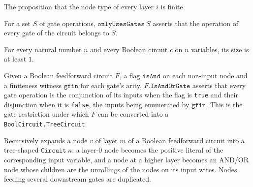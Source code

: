 \begin{definition}
\label{BoolCircuit.LayeredCircuit.Finite}
\leanok
The proposition that the node type of every layer $i$ is finite.
\end{definition}

\begin{definition}
\label{BoolCircuit.LayeredCircuit.onlyUsesGates}
\leanok
{}
For a set $S$ of gate operations, $\texttt{onlyUsesGates}\ S$ asserts that the
operation of every gate of the circuit belongs to $S$.
\end{definition}

\begin{theorem}
\label{BoolCircuit.TreeCircuit.one_le_size}
\leanok
{}
For every natural number $n$ and every Boolean circuit $c$ on $n$ variables, its size is
at least $1$.
\end{theorem}

\begin{definition}
\label{BoolCircuit.LayeredCircuit.IsAndOrGate}
\leanok
{}
Given a Boolean feedforward circuit $F$, a flag $\texttt{isAnd}$ on each non-input
node and a finiteness witness $\texttt{gfin}$ for each gate's arity,
$F.\texttt{IsAndOrGate}$ asserts that every gate operation is the conjunction of its
inputs when the flag is \texttt{true} and their disjunction when it is \texttt{false},
the inputs being enumerated by $\texttt{gfin}$. This is the gate restriction under
which $F$ can be converted into a \texttt{BoolCircuit.TreeCircuit}.
\end{definition}

\begin{definition}
\label{BoolCircuit.nodeToTreeCircuit}
\leanok
{}
Recursively expands a node $v$ of layer $m$ of a Boolean feedforward circuit into a
tree-shaped $\texttt{Circuit}\ n$: a layer-$0$ node becomes the positive literal of the
corresponding input variable, and a node at a higher layer becomes an AND/OR node
whose children are the unrollings of the nodes on its input wires. Nodes feeding
several downstream gates are duplicated.
\end{definition}


